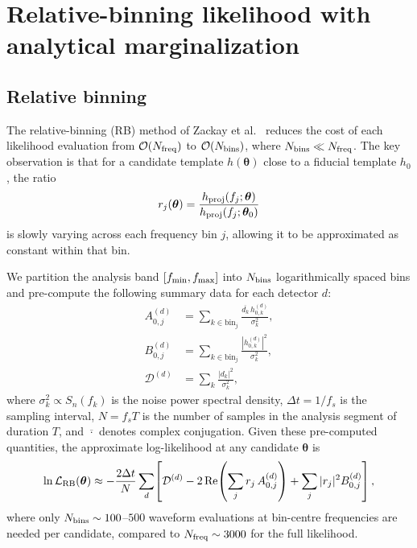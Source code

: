 \documentclass[twocolumn,superscriptaddress,nofootinbib,aps,prd]{revtex4-2}
\begin{document}
\section{Relative-binning likelihood with analytical marginalization}
\label{sec:relbin}

\subsection{Relative binning}

The relative-binning (RB) method of Zackay et al.~\cite{Zackay:2018}
reduces the cost of each likelihood evaluation from $\mathcal{O}(N_{\rm freq})$
to $\mathcal{O}(N_{\rm bins})$, where $N_{\rm bins} \ll N_{\rm freq}$.  The
key observation is that for a candidate template $h(\bm{\theta})$ close to a
fiducial template $h_0$, the ratio
\begin{equation}
    r_j(\bm{\theta}) = \frac{h_{\rm proj}(f_j;\bm{\theta})}{h_{\rm proj}(f_j;\bm{\theta}_0)}
\end{equation}
is slowly varying across each frequency bin $j$, allowing it to be
approximated as constant within that bin.

We partition the analysis band $[f_{\rm min}, f_{\rm max}]$ into
$N_{\rm bins}$ logarithmically spaced bins and pre-compute the following
summary data for each detector $d$:
\begin{align}
    A_{0,j}^{(d)} &= \sum_{k \in \mathrm{bin}_j}
        \frac{\overline{d_k}\, h_{0,k}^{(d)}}{\sigma_k^2}, \label{eq:A0}\\
    B_{0,j}^{(d)} &= \sum_{k \in \mathrm{bin}_j}
        \frac{|h_{0,k}^{(d)}|^2}{\sigma_k^2}, \label{eq:B0}\\
    \mathcal{D}^{(d)} &= \sum_k \frac{|d_k|^2}{\sigma_k^2}, \label{eq:dd}
\end{align}
where $\sigma_k^2 \propto S_n(f_k)$ is the noise power spectral density,
$\Delta t = 1/f_s$ is the sampling interval, $N = f_s T$ is the number of
samples in the analysis segment of duration $T$, and $\overline{\cdot}$
denotes complex conjugation.  Given these pre-computed
quantities, the approximate log-likelihood at any candidate $\bm{\theta}$ is
\begin{equation}
    \ln \mathcal{L}_{\rm RB}(\bm{\theta}) \approx
    -\frac{2\Delta t}{N}\sum_d \!\left[
        \mathcal{D}^{(d)}
        - 2\,\mathrm{Re}\!\left(\sum_j r_j \, A_{0,j}^{(d)}\right)
        + \sum_j |r_j|^2 B_{0,j}^{(d)}
    \right],
\end{equation}
where only $N_{\rm bins} \sim 100$--$500$ waveform evaluations at bin-centre
frequencies are needed per candidate, compared to $N_{\rm freq} \sim 3000$
for the full likelihood.
\end{document}
